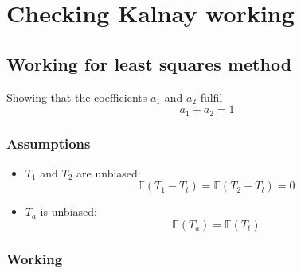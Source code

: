 \chapter{Checking Kalnay working}
\label{app:kalnay_working}

\section{Working for least squares method}
\label{sec:kalnay_working:least_squares}

Showing that the coefficients $a_1$ and $a_2$ fulfil
\begin{equation}
a_1 + a_2 = 1
\end{equation}

\subsection{Assumptions}
\label{sub:least_squares:assumptions}

\begin{itemize}
    \item $T_1$ and $T_2$ are unbiased:
    \begin{equation}
        \mathbb{E}(T_1 - T_t) = \mathbb{E}(T_2 - T_t) = 0
    \end{equation}
    \item $T_a$ is unbiased:
    \begin{equation}
        \mathbb{E}(T_a) = \mathbb{E}(T_t)
    \end{equation}
\end{itemize}

\subsection{Working}
\label{sub:least_squares:working}

